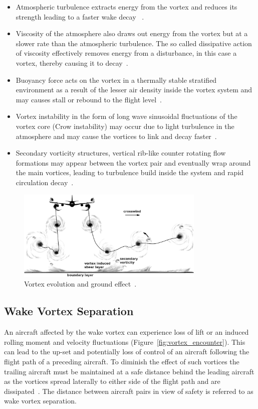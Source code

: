 \begin{itemize}
    \item Atmospheric turbulence extracts energy from the vortex and reduces its strength leading to a faster wake decay ~\cite{Hallock2018Apr}.
    \item Viscosity of the atmosphere also draws out energy from the vortex but at a slower rate than the atmospheric turbulence. The so called dissipative action of viscosity  effectively removes energy from a disturbance, in this case a vortex, thereby causing it to decay~\cite{Hallock2018Apr, houghton2012aerodynamics}.
    \item Buoyancy force acts on the vortex in a thermally stable stratified environment as a result of the lesser air density inside the vortex system and may causes stall or rebound to the flight level~\cite{Holzapfel2001Feb, gerz_commercial_2002}.
    \item Vortex instability in the form of long wave sinusoidal fluctuations of the vortex core (Crow instability) may occur due to light turbulence in the atmosphere and may cause the vortices to link and decay faster~\cite{Hallock2018Apr, crow2003stability}.
    \item Secondary vorticity structures, vertical rib-like counter rotating flow formations may appear between the vortex pair and eventually wrap around the main vortices, leading to turbulence build inside the system and rapid circulation decay~\cite{Holzapfel2001Feb, Holzapfel2003Jun}.
\end{itemize}


\begin{figure}[h]
    \centering
    \includegraphics[width=0.8\textwidth]{graphics/Hallock_vortex_evolution.jpg}
    \caption[Wake vortex and ground effect]{Vortex evolution and ground effect~\cite[p.~29]{Hallock2018Apr}.} \label{fig:vortex_ground_effect}
\end{figure}


\subsection{Wake Vortex Separation}
An aircraft affected by the wake vortex can experience loss of lift or an induced rolling moment and velocity fluctuations (Figure~\ref{fig:vortex_encounter}).
This can lead to the up-set and potentially loss of control of an aircraft following the flight path of a preceding aircraft.
To diminish the effect of such vortices the trailing aircraft must be maintained at a safe distance behind the leading aircraft as the vortices spread laterally to either side of the flight path and are dissipated~\cite{Breitsamter2011Feb}.
The distance between aircraft pairs in view of safety is referred to as wake vortex separation. 

